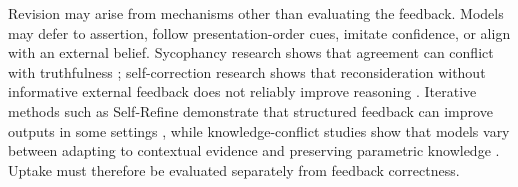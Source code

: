 Revision may arise from mechanisms other than evaluating the feedback. Models may defer to assertion, follow presentation-order cues, imitate confidence, or align with an external belief. Sycophancy research shows that agreement can conflict with truthfulness \cite{sharma2024sycophancy}; self-correction research shows that reconsideration without informative external feedback does not reliably improve reasoning \cite{huang2024selfcorrect,kamoi2024selfcorrection}. Iterative methods such as Self-Refine demonstrate that structured feedback can improve outputs in some settings \cite{madaan2023selfrefine}, while knowledge-conflict studies show that models vary between adapting to contextual evidence and preserving parametric knowledge \cite{xie2024chameleon}. Uptake must therefore be evaluated separately from feedback correctness.
